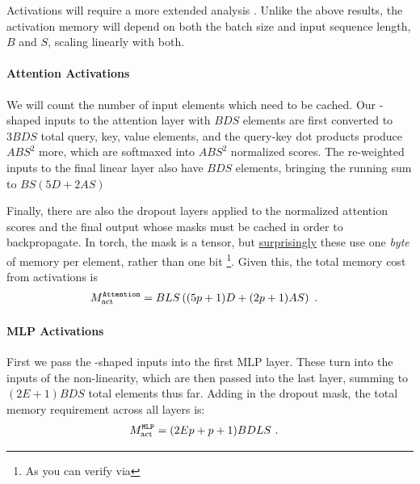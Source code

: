 \documentclass[11pt]{article}
\begin{document}
Activations will require a more extended analysis \cite{korthikanti2022reducing}. Unlike the above
results, the activation memory will depend on both the batch size and input sequence length, $ B $
and $ S $, scaling linearly with both.



\paragraph{Attention Activations}

We will count the number of input elements which need to be cached. Our -shaped inputs
to the attention layer with $ BDS $ elements are first converted to $ 3BDS $ total query, key, value
elements, and the query-key dot products produce $ ABS ^{ 2 } $ more, which are softmaxed into $ ABS
		^{ 2 } $ normalized scores. The re-weighted inputs to the final linear layer also have $ BDS $
elements, bringing the running sum to $ BS \left ( 5D + 2AS  \right ) $

Finally, there are also the dropout layers applied to the normalized attention scores and the final
output whose masks must be cached in order to
backpropagate. In torch, the mask is a  tensor, but
\href{https://github.com/pytorch/pytorch/issues/41571}{surprisingly} these use one \textit{byte} of
memory per element, rather than one bit \footnote{As you can verify
	via }.
Given this, the total memory cost from activations is
\begin{align}
	M _{ \rm act  } ^\texttt{Attention} & = BLS \left ( (5p+1)D + (2p+1)AS  \right ) \ .
	\label{eq_att_actmem_vanilla}
\end{align}




\paragraph{MLP Activations}

First we pass the -shaped inputs into the first MLP layer. These turn into the
 inputs of the non-linearity, which are then passed into the last
 layer, summing to $ (2E+1)BDS $ total elements thus far. Adding in the dropout
mask, the total memory requirement across all  layers is:
\begin{align}
	M _{ \rm act  } ^\texttt{MLP} & = (2Ep+p+1)BDLS\ .
	\label{eq_mlp_actmem_vanilla}
\end{align}
\end{document}
